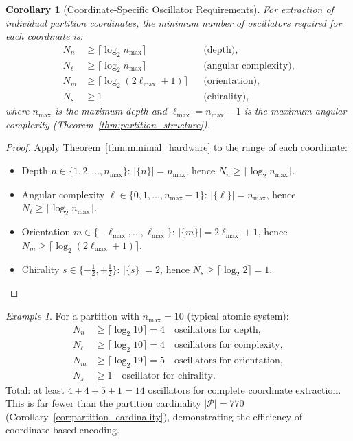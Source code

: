 \documentclass[twocolumn,10pt,a4paper]{article}
\newtheorem{corollary}[theorem]{Corollary}
\theoremstyle{remark}
\newtheorem{example}[theorem]{Example}
\newcommand{\partition}{\mathcal{P}}
\begin{document}
\begin{corollary}[Coordinate-Specific Oscillator Requirements]
\label{cor:coord_oscillators}
For extraction of individual partition coordinates, the minimum number of oscillators required for each coordinate is:
\begin{align}
N_n &\geq \lceil \log_2 n_{\max} \rceil && \text{(depth)}, \\
N_\ell &\geq \lceil \log_2 n_{\max} \rceil && \text{(angular complexity)}, \\
N_m &\geq \lceil \log_2 (2\ell_{\max} + 1) \rceil && \text{(orientation)}, \\
N_s &\geq 1 && \text{(chirality)},
\end{align}
where $n_{\max}$ is the maximum depth and $\ell_{\max} = n_{\max} - 1$ is the maximum angular complexity (Theorem~\ref{thm:partition_structure}).
\end{corollary}

\begin{proof}
Apply Theorem~\ref{thm:minimal_hardware} to the range of each coordinate:
\begin{itemize}[noitemsep]
    \item Depth $n \in \{1, 2, \ldots, n_{\max}\}$: $|\{n\}| = n_{\max}$, hence $N_n \geq \lceil \log_2 n_{\max} \rceil$.
    \item Angular complexity $\ell \in \{0, 1, \ldots, n_{\max} - 1\}$: $|\{\ell\}| = n_{\max}$, hence $N_\ell \geq \lceil \log_2 n_{\max} \rceil$.
    \item Orientation $m \in \{-\ell_{\max}, \ldots, \ell_{\max}\}$: $|\{m\}| = 2\ell_{\max} + 1$, hence $N_m \geq \lceil \log_2(2\ell_{\max} + 1) \rceil$.
    \item Chirality $s \in \{-\tfrac{1}{2}, +\tfrac{1}{2}\}$: $|\{s\}| = 2$, hence $N_s \geq \lceil \log_2 2 \rceil = 1$.
\end{itemize}
\end{proof}

\begin{example}
For a partition with $n_{\max} = 10$ (typical atomic system):
\begin{align}
N_n &\geq \lceil \log_2 10 \rceil = 4 \quad \text{oscillators for depth}, \\
N_\ell &\geq \lceil \log_2 10 \rceil = 4 \quad \text{oscillators for complexity}, \\
N_m &\geq \lceil \log_2 19 \rceil = 5 \quad \text{oscillators for orientation}, \\
N_s &\geq 1 \quad \text{oscillator for chirality}.
\end{align}
Total: at least $4 + 4 + 5 + 1 = 14$ oscillators for complete coordinate extraction. This is far fewer than the partition cardinality $|\partition| = 770$ (Corollary~\ref{cor:partition_cardinality}), demonstrating the efficiency of coordinate-based encoding.
\end{example}
\end{document}
